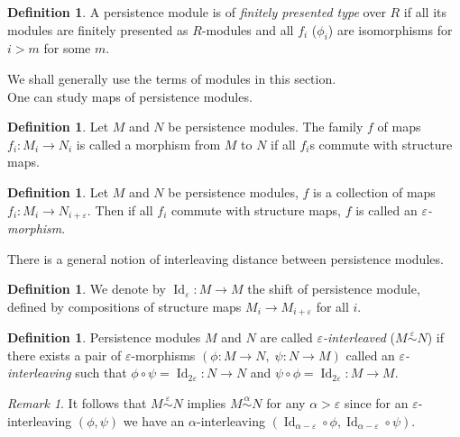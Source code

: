 \documentclass[english,12pt]{article}
\newcounter{stmcounter}[section]
\numberwithin{equation}{section}
\theoremstyle{definition}
\newtheorem{definition}[stmcounter]{Definition}
\theoremstyle{remark}
\newtheorem{remark}[stmcounter]{Remark}
\newcommand{\define}[1]{{\textit{#1}}}
\begin{document}
\begin{definition}
  A persistence module is of \define{finitely presented type} over $R$ if all its modules are finitely presented as $R$-modules and all $f_i$ ($\phi_i$) are isomorphisms for $i > m$ for some $m$.
\end{definition}

We shall generally use the terms of modules in this section.\\

One can study maps of persistence modules. 

\begin{definition}
  Let $M$ and $N$ be persistence modules. The family $f$ of maps $f_i : M_i \to N_i$ is called a morphism from $M$ to $N$ if all $f_i$s commute with structure maps.
\end{definition}

\begin{definition}
  Let $M$ and $N$ be persistence modules, $f$ is a collection of maps $f_i : M_i \to N_{i+\varepsilon}$. Then if all $f_i$ commute with structure maps, $f$ is called an \define{$\varepsilon$-morphism}.
\end{definition}

There is a general notion of interleaving distance between persistence modules.

\begin{definition}
  We denote by $\operatorname{Id}_{\varepsilon} : M \to M$ the shift of persistence module, defined by compositions of structure maps $M_i \to M_{i+\varepsilon}$ for all $i$.
\end{definition}

\begin{definition}
  Persistence modules $M$ and $N$ are called \define{$\varepsilon$-interleaved} ($M \stackrel{\varepsilon}{\sim} N$) if there exists a pair of $\varepsilon$-morphisms $(\phi : M \to N,\;\psi : N \to M)$ called an \define{$\varepsilon$-interleaving} such that $\phi \circ \psi = \operatorname{Id}_{2\varepsilon} : N \to N$ and $\psi \circ \phi = \operatorname{Id}_{2\varepsilon} : M \to M$.\\
\end{definition}

\begin{remark}
  It follows that $M \stackrel{\varepsilon}{\sim} N$ implies $M \stackrel{\alpha}{\sim} N$ for any $\alpha > \varepsilon$ since for an $\varepsilon$-interleaving $(\phi, \psi)$ we have an $\alpha$-interleaving $(\operatorname{Id}_{\alpha - \varepsilon} \circ \phi, \operatorname{Id}_{\alpha - \varepsilon} \circ \psi)$.
\end{remark}
\end{document}
